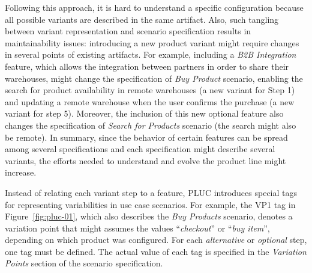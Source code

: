 \documentclass{acm_proc_article-sp}
\begin{document}
Following this approach, it is hard to understand a specific configuration because all possible variants are described in the same artifact. Also, such tangling between variant representation and scenario specification results in maintainability issues: introducing a new product variant might require changes in several points of existing artifacts.  For example, including a \emph{B2B Integration} feature, which allows the integration between partners in order to share their warehouses, might change the specification of \emph{Buy Product} scenario, enabling the search for product availability in remote warehouses (a new variant for Step 1) and updating a remote warehouse when the user confirms the purchase (a new variant for step 5). Moreover, the inclusion of this new optional feature also changes the specification of \emph{Search for Products} scenario (the search might also be remote). In summary, since the behavior of certain features can be spread among several specifications and each specification might describe several variants, the efforts needed to understand and evolve the product line might increase.    

Instead of relating each variant step to a feature, PLUC introduces special tags for representing 
variabilities in use case scenarios. For example, the VP1 tag in Figure~\ref{fig:pluc-01}, which also 
describes the \emph{Buy Products} scenario, denotes a variation point that might assumes the 
values ``\emph{checkout}'' or ``\emph{buy item}'', depending on which product was configured. For 
each \emph{alternative} or \emph{optional} step, one tag must be defined. The actual value
of each tag is specified in the \emph{Variation Points} section of the scenario specification. 
\end{document}

